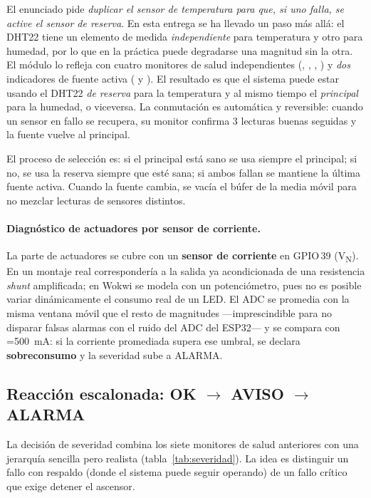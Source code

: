 El enunciado pide \emph{duplicar el sensor de temperatura para que, si uno
falla, se active el sensor de reserva}. En esta entrega se ha llevado un paso
más allá: el DHT22 tiene un elemento de medida \emph{independiente} para
temperatura y otro para humedad, por lo que en la práctica puede degradarse
una magnitud sin la otra. El módulo lo refleja con cuatro monitores de salud
independientes (, , ,
) y \emph{dos} indicadores de fuente activa
( y ). El resultado es que el
sistema puede estar usando el DHT22 \emph{de reserva} para la temperatura y
al mismo tiempo el \emph{principal} para la humedad, o viceversa. La
conmutación es automática y reversible: cuando un sensor en fallo se
recupera, su monitor confirma 3 lecturas buenas seguidas y la fuente vuelve
al principal.

El proceso de selección es: si el principal está sano se usa siempre el
principal; si no, se usa la reserva siempre que esté sana; si ambos fallan
se mantiene la última fuente activa. Cuando la fuente cambia, se vacía el
búfer de la media móvil para no mezclar lecturas de sensores distintos.

\paragraph{Diagnóstico de actuadores por sensor de corriente.}\label{sub:corriente}

La parte de actuadores se cubre con un \textbf{sensor de corriente} en
GPIO\,39 (V\textsubscript{N}). En un montaje real correspondería a la salida
ya acondicionada de una resistencia \emph{shunt} amplificada; en Wokwi se
modela con un potenciómetro, pues no es posible variar dinámicamente el
consumo real de un LED. El ADC se promedia con la misma ventana móvil que el
resto de magnitudes ---imprescindible para no disparar falsas alarmas con el
ruido del ADC del ESP32--- y se compara con
=\SI{500}{\milli\ampere}: si la corriente
promediada supera ese umbral, se declara \textbf{sobreconsumo} y la
severidad sube a \textsf{ALARMA}.

\subsection{Reacción escalonada: OK $\rightarrow$ AVISO $\rightarrow$ ALARMA}\label{sub:severidad}

La decisión de severidad combina los siete monitores de salud anteriores con
una jerarquía sencilla pero realista (tabla~\ref{tab:severidad}). La idea es
distinguir un fallo con respaldo (donde el sistema puede seguir operando) de
un fallo crítico que exige detener el ascensor.

